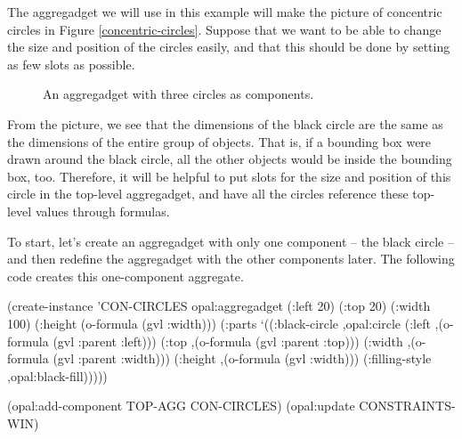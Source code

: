 The aggregadget we will use in this example will make the picture of
concentric circles in Figure \ref{concentric-circles}.  Suppose that
we want to be able to change the size and position of the circles
easily, and that this should be done by setting as few slots as
possible.

\begin{figure}
\begin{center}
\begin{makeimage}
\end{makeimage}
\begin{latexonly}
\end{latexonly}
\end{center}
\caption{An aggregadget with three circles as components.}
\end{figure}

From the picture, we see that the dimensions of the black circle are
the same as the dimensions of the entire group of objects.  That is,
if a bounding box were drawn around the black circle, all the other
objects would be inside the bounding box, too.
Therefore, it will be helpful to put slots for the size and position
of this circle in the top-level aggregadget, and have all the circles
reference these top-level values through formulas.

To start, let's create an aggregadget with only one component -- the
black circle -- and then redefine the aggregadget with the other
components later.  The following code creates this one-component
aggregate.

\begin{programexample}
(create-instance 'CON-CIRCLES opal:aggregadget
   (:left 20) (:top 20)
   (:width 100)
   (:height (o-formula (gvl :width)))
   (:parts
    `((:black-circle ,opal:circle
                     (:left ,(o-formula (gvl :parent :left)))
                     (:top ,(o-formula (gvl :parent :top)))
                     (:width ,(o-formula (gvl :parent :width)))
                     (:height ,(o-formula (gvl :width)))
                     (:filling-style ,opal:black-fill)))))

(opal:add-component TOP-AGG CON-CIRCLES)
(opal:update CONSTRAINTS-WIN)
\end{programexample}

